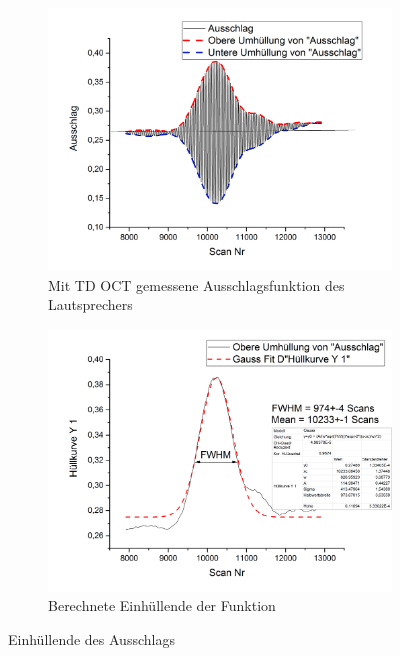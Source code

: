 \documentclass[german, %
parskip=full, %
bibliography=totoc, %
]{scrartcl}
\begin{document}
\begin{figure}[ht]
	\centering
	\begin{subfigure}[b]{0.4\textwidth}
	   \includegraphics[width=\textwidth]{TD_OCT_DATA_Einhullende}
		 \caption{Mit TD OCT gemessene Ausschlagsfunktion des Lautsprechers}
	\end{subfigure}
	\begin{subfigure}[b]{0.4\textwidth}
	   \includegraphics[width=\textwidth]{TD_OCT_FINAL}
		 \caption{Berechnete Einhüllende der Funktion}
	\end{subfigure}
  \caption{Einhüllende des Ausschlags}
	\label{fig:hull}
\end{figure}
\end{document}
